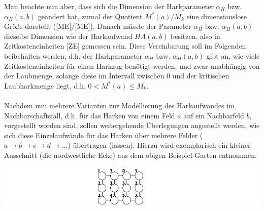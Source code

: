 \documentclass[fontsize=12pt,doubleside,openany,listof=totoc,listof=flat,listof=nochaptergap,numbers=noenddot]{scrbook}
\theoremstyle{style}
\begin{document}
\noindent Man beachte nun aber, dass sich die Dimension der Harkparameter $\alpha_H$ 
bzw. $\alpha_H(a,b)$ geändert hat, zumal der Quotient $M^*(a)/M_k$ eine
dimensionslose Größe darstellt ([ME]/[ME]). Danach müsste der Parameter
$\alpha_H$ bzw. $\alpha_H(a,b)$ dieselbe Dimension wie der Harkaufwand
$HA(a,b)$ besitzen, also in Zeitkosteneinheiten [ZE] gemessen sein. Diese
Vereinbarung soll im Folgenden beibehalten werden, d.h. der Harkparameter 
$\alpha_H$ bzw. $\alpha_H(a,b)$ gibt an, wie viele Zeitkosteneinheiten 
für einen Harkzug benötigt werden, und zwar unabhängig von der Laubmenge, 
solange diese im Intervall zwischen 0 und der kritischen Laubharkmenge liegt, 
d.h. $0<M^*(a) \leq M_k$.
\\ \\
Nachdem nun mehrere Varianten zur Modellierung des Harkaufwandes 
im Nachbarschaftsfall, d.h. für das Harken von einem Feld $a$ auf 
ein Nachbarfeld $b$, vorgestellt worden sind, sollen weitergehende 
Überlegungen angestellt werden, wie sich diese Einzelaufwände für 
das Harken über mehrere Felder ($a \rightarrow b \rightarrow c \rightarrow d \rightarrow ...$) 
übertragen (lassen). Hierzu wird exemplarisch ein kleiner Ausschnitt 
(die nordwestliche Ecke) aus dem obigen Beispiel-Garten entnommen. 

\begin{center}
\begin{minipage}{\textwidth}
\centerline{\includegraphics[angle=0,scale=0.9]{Figures/Laub/Gartenausschnitt.jpg}}
\label{HJKmlp_image_Gartenausschnitt}
\end{minipage}
\end{center}
\end{document}
